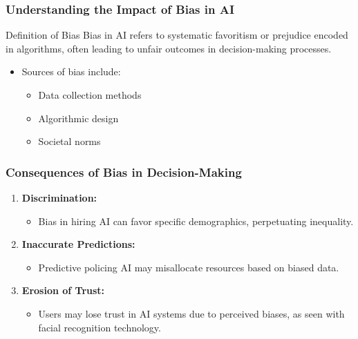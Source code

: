 \documentclass[aspectratio=169]{beamer}
\begin{document}
\begin{frame}[fragile]
    \frametitle{Understanding the Impact of Bias in AI}
    \begin{block}{Definition of Bias}
        Bias in AI refers to systematic favoritism or prejudice encoded in algorithms, often leading to unfair outcomes in decision-making processes. 
    \end{block}

    \begin{itemize}
        \item Sources of bias include:
            \begin{itemize}
                \item Data collection methods
                \item Algorithmic design
                \item Societal norms
            \end{itemize}
    \end{itemize}
\end{frame}

\begin{frame}[fragile]
    \frametitle{Consequences of Bias in Decision-Making}
    \begin{enumerate}
        \item \textbf{Discrimination:}
            \begin{itemize}
                \item Bias in hiring AI can favor specific demographics, perpetuating inequality.
            \end{itemize}
        \item \textbf{Inaccurate Predictions:}
            \begin{itemize}
                \item Predictive policing AI may misallocate resources based on biased data.
            \end{itemize}
        \item \textbf{Erosion of Trust:}
            \begin{itemize}
                \item Users may lose trust in AI systems due to perceived biases, as seen with facial recognition technology.
            \end{itemize}
    \end{enumerate}
\end{frame}
\end{document}
